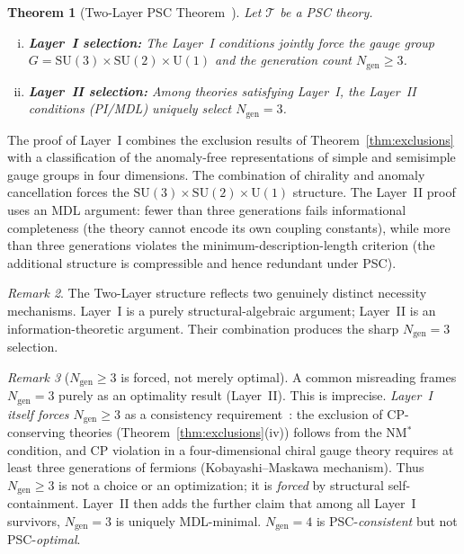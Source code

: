 \documentclass[11pt,twocolumn]{article}
\newtheorem{theorem}{Theorem}[section]
\theoremstyle{remark}
\newtheorem{remark}[theorem]{Remark}
\begin{document}
\begin{theorem}[Two-Layer PSC Theorem~{\cite{SpivackPSCOpt}}]
\label{thm:two-layer}
Let $\mathcal{T}$ be a PSC theory.
\begin{enumerate}[(i)]
  \item \textbf{Layer~I selection:} The Layer~I conditions jointly
        force the gauge group $G=\mathrm{SU}(3)\times\mathrm{SU}(2)
        \times\mathrm{U}(1)$ and the generation count
        $N_{\mathrm{gen}}\geq 3$.
  \item \textbf{Layer~II selection:} Among theories satisfying
        Layer~I, the Layer~II conditions (PI/MDL) uniquely select
        $N_{\mathrm{gen}}=3$.
\end{enumerate}
\end{theorem}

The proof of Layer~I combines the exclusion results of
Theorem~\ref{thm:exclusions} with a classification of the
anomaly-free representations of simple and semisimple gauge groups
in four dimensions.
The combination of chirality and anomaly cancellation forces the
$\mathrm{SU}(3)\times\mathrm{SU}(2)\times\mathrm{U}(1)$ structure.
The Layer~II proof uses an MDL argument: fewer than three generations
fails informational completeness (the theory cannot encode its own
coupling constants), while more than three generations violates the
minimum-description-length criterion (the additional structure is
compressible and hence redundant under PSC).

\begin{remark}
The Two-Layer structure reflects two genuinely distinct necessity
mechanisms. Layer~I is a purely structural-algebraic argument;
Layer~II is an information-theoretic argument.
Their combination produces the sharp $N_{\mathrm{gen}}=3$ selection.
\end{remark}

\begin{remark}[$N_{\mathrm{gen}}\geq 3$ is forced, not merely optimal]
\label{rem:ngen-forced}
A common misreading frames $N_{\mathrm{gen}}=3$ purely as an
optimality result (Layer~II). This is imprecise.
\emph{Layer~I itself forces $N_{\mathrm{gen}}\geq 3$} as a consistency
requirement~\cite{SpivackNMstar}: the exclusion of CP-conserving
theories (Theorem~\ref{thm:exclusions}(iv)) follows from the NM$^*$
condition, and CP violation in a four-dimensional chiral gauge theory
requires at least three generations of fermions (Kobayashi--Maskawa
mechanism).
Thus $N_{\mathrm{gen}}\geq 3$ is not a choice or an optimization;
it is \emph{forced} by structural self-containment.
Layer~II then adds the further claim that among all Layer~I survivors,
$N_{\mathrm{gen}}=3$ is uniquely MDL-minimal.
$N_{\mathrm{gen}}=4$ is PSC-\emph{consistent} but not
PSC-\emph{optimal}.
\end{remark}
\end{document}
